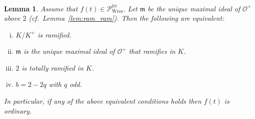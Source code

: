 \documentclass[11pt]{amsart}
\newcommand\cO{\mathcal{O}}
\newcommand\frm{\mathfrak{m}}
\theoremstyle{plain}
\newtheorem{lemma}[theorem]{Lemma}
\theoremstyle{definition}
\newcommand\PirrB{\mathcal{P}^\mathrm{irr}_\mathrm{Wres}}
\begin{document}
\begin{lemma}\label{lem:ram_tot_ram}
    Assume that $f(t) \in \PirrB$.
    Let $\frm$ be the unique maximal ideal of $\cO^+$ above $2$ (cf.~Lemma~\ref{lem:ram_ram}).
    Then the following are equivalent:
    \begin{enumerate}[(i)]
        \item \label{lem:ram_tot_ram:KKp_ram} $K/K^+$ is ramified.
        \item \label{lem:ram_tot_ram:q_ram} $\frm$ is the unique maximal ideal of $\cO^+$ that ramifies in $K$.
        \item \label{lem:ram_tot_ram:2_tot_ram} $2$ is totally ramified in $K$.
        \item \label{lem:ram_tot_ram:b} $b=2-2q$ with $q$ odd.
    \end{enumerate}
    In particular, if any of the above equivalent conditions holds then $f(t)$ is ordinary.
\end{lemma}
\end{document}
